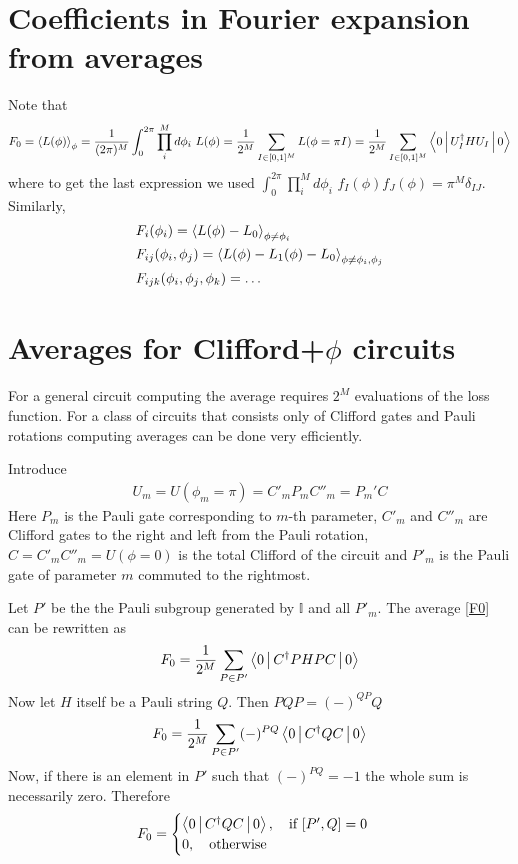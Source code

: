 \documentclass[12 pt]{article}
\begin{document}
\section{Coefficients in Fourier expansion from averages} \label{Fourier from averages}
Note that 
\begin{align}
F_0=\Braket{L(\phi)}_\phi=\frac1{(2\pi)^M}\int_0^{2\pi}\prod_i^M d\phi_i\,\, L(\phi)=\frac1{2^M}\sum_{I\in [0, 1]^M} L(\phi=\pi I)=\frac1{2^M}\sum_{I\in [0,1]^M}\Braket{0|U_I^\dagger H U_I|0}\label{F0}
\end{align}
where to get the last expression we used $\int_0^{2\pi} \prod_i^Md\phi_i\,\, f_I(\phi)f_J(\phi)=\pi^M \delta_{IJ}$. Similarly,
\begin{align}
&F_i(\phi_i)=\Braket{L(\phi)-L_0}_{\phi\neq\phi_i}\\	&F_{ij}(\phi_i,\phi_j)=\Braket{L(\phi)-L_1(\phi)-L_0}_{\phi\neq \phi_i,\phi_j}\\
&F_{ijk}(\phi_i,\phi_j,\phi_k)=\dots
\end{align}
\section{Averages for Clifford+$\phi$ circuits} \label{clifford averages}
For a general circuit computing the average requires $2^M$ evaluations of the loss function. For a class of circuits that consists only of Clifford gates and Pauli rotations computing averages can be done very efficiently.

Introduce
\begin{align}
	U_m=U(\phi_m=\pi)=C'_m P_m C''_m=P_m' C 
\end{align}
Here $P_m$ is the Pauli gate corresponding to $m$-th parameter, $C'_m$ and $C''_m$ are Clifford gates to the right and left from the Pauli rotation, $C=C'_mC''_m=U(\phi=0)$ is the total Clifford of the circuit and $P'_m$ is the Pauli gate of parameter $m$ commuted to the rightmost.

Let $P'$ be the the Pauli subgroup generated by $\mathbb{I}$ and all $P'_m$. The average \eqref{F0} can be rewritten as
\begin{align}
F_0=\frac1{2^M}\sum_{P\in P'}\Braket{0|C^\dagger PHPC|0}
\end{align}
Now let $H$ itself be a Pauli string $Q$. Then $PQP=(-)^{QP}Q$ 
\begin{align}
F_0=\frac1{2^M}\sum_{P\in P'}(-)^{PQ}\Braket{0|C^\dagger Q C|0}
\end{align}
Now, if there is an element in $P'$ such that $(-)^{PQ}=-1$ the whole sum is necessarily zero. Therefore
\begin{align}
F_0=\begin{cases}\Braket{0|C^\dagger Q C|0},\quad \text{if } [P', Q]=0\\0,\quad \text{otherwise}\end{cases}
\end{align}
\end{document}
